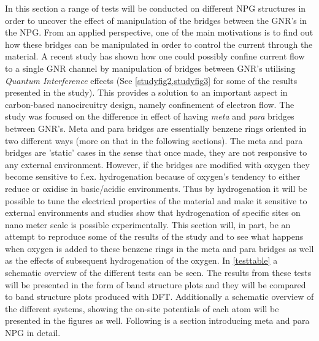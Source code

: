 In this section a range of tests will be conducted on different NPG structures in order to uncover the effect of manipulation of the bridges between the GNR's in the NPG. From an applied perspective, one of the main motivations is to find out how these bridges can be manipulated in order to control the current through the material. A recent study has shown how one could possibly confine current flow to a single GNR channel by manipulation of bridges between GNR's utilising \textit{Quantum Interference} effects (See \cref{studyfig2,studyfig3} for some of the results presented in the study). This provides a solution to an important aspect in carbon-based nanocircuitry design, namely confinement of electron flow. The study was focused on the difference in effect of having \textit{meta} and \textit{para} bridges between GNR's. Meta and para bridges are essentially benzene rings oriented in two different ways (more on that in the following sections). The meta and para bridges are 'static' cases in the sense that once made, they are not responsive to any external environment. However, if the bridges are modified with oxygen they become sensitive to f.ex. hydrogenation because of oxygen's tendency to either reduce or oxidise in basic/acidic environments. Thus by hydrogenation it will be possible to tune the electrical properties of the material and make it sensitive to external environments and studies show that hydrogenation of specific sites on nano meter scale is possible experimentally. This section will, in part, be an attempt to reproduce some of the results of the study and to see what happens when oxygen is added to these benzene rings in the meta and para bridges as well as the effects of subsequent hydrogenation of the oxygen.  In \cref{testtable} a schematic overview of the different tests can be seen. The results from these tests will be presented in the form of band structure plots and they will be compared to band structure plots produced with DFT. Additionally a schematic overview of the different systems, showing the on-site potentials of each atom will be presented in the figures as well. Following is a section introducing meta and para NPG in detail. 
